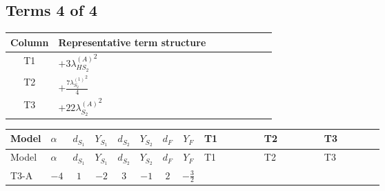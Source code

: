 \documentclass[8pt]{article}
\begin{document}
\begin{landscape}
\subsection*{Terms 4 of 4}
\begin{center}
\begin{tabular}{@{}c >{\raggedright\arraybackslash}p{0.82\linewidth}@{}}
\toprule
Column & Representative term structure \\
\midrule
T1 & \(\displaystyle +3 {\lambda_{HS_2}^{(A)}}^2\) \\
\midrule
T2 & \(\displaystyle +\frac{7 {\lambda_{S_2}^{(1)}}^2}{4}\) \\
\midrule
T3 & \(\displaystyle +22 {\lambda_{S_2}^{(A)}}^2\) \\
\midrule
\bottomrule
\end{tabular}
\end{center}
\smallskip
\tiny
\begin{longtable}{@{}llcccccc >{\raggedright\arraybackslash}p{0.21\linewidth} >{\raggedright\arraybackslash}p{0.21\linewidth} >{\raggedright\arraybackslash}p{0.21\linewidth}@{}}
\toprule
Model & $\alpha$ & $d_{S_1}$ & $Y_{S_1}$ & $d_{S_2}$ & $Y_{S_2}$ & $d_F$ & $Y_F$ & T1 & T2 & T3 \\
\midrule
\endfirsthead
\toprule
Model & $\alpha$ & $d_{S_1}$ & $Y_{S_1}$ & $d_{S_2}$ & $Y_{S_2}$ & $d_F$ & $Y_F$ & T1 & T2 & T3 \\
\midrule
\endhead
T3-A & $-4$ & $1$ & $-2$ & $3$ & $-1$ & $2$ & $-\frac{3}{2}$ & \scriptsize\adjustbox{max width=\linewidth}{$\begin{gathered} +3 {\lambda_{HS_2}^{(A)}}^2\end{gathered}$} & \scriptsize\adjustbox{max width=\linewidth}{$\begin{gathered} +\frac{7 {\lambda_{S_2}^{(1)}}^2}{4}\end{gathered}$} & \scriptsize\adjustbox{max width=\linewidth}{$\begin{gathered} +22 {\lambda_{S_2}^{(A)}}^2\end{gathered}$} \\
\midrule
\bottomrule
\end{longtable}
\end{landscape}
\end{document}

